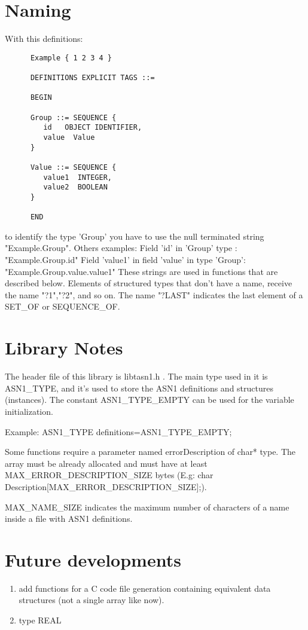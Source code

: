 \documentclass{book}
\begin{document}
\section{Naming}
With this definitions:

\begin{verbatim}
      Example { 1 2 3 4 }

      DEFINITIONS EXPLICIT TAGS ::=

      BEGIN 

      Group ::= SEQUENCE {
         id   OBJECT IDENTIFIER,
         value  Value
      }

      Value ::= SEQUENCE {
         value1  INTEGER,
         value2  BOOLEAN 
      }

      END
\end{verbatim}

to identify the type 'Group' you have to use the null terminated string "Example.Group".
Others examples:
Field 'id' in 'Group' type :  "Example.Group.id"
Field 'value1' in field 'value' in type 'Group':   "Example.Group.value.value1" 
These strings are used in functions that are described below.
Elements of structured types that don't have a name, receive the name "?1","?2", and so on. 
The name "?LAST" indicates the last element of a SET\_OF or SEQUENCE\_OF.

\section{Library Notes}
The header file of this library is libtasn1.h .
The main type used in it is ASN1\_TYPE, and it's used to
store the ASN1 definitions and structures (instances).
The constant ASN1\_TYPE\_EMPTY can be used for the variable initialization.
\par
Example:  ASN1\_TYPE  definitions=ASN1\_TYPE\_EMPTY;
\par 
Some functions require a parameter named errorDescription of char* type.
The array must be already allocated and must have at least
MAX\_ERROR\_DESCRIPTION\_SIZE bytes
(E.g: char Description[MAX\_ERROR\_DESCRIPTION\_SIZE];). 
\par
MAX\_NAME\_SIZE indicates the maximum number of characters of a name inside
a file with ASN1 definitions. 

\section{Future developments}
\begin{enumerate}
\item add functions for a C code file generation containing equivalent 
data structures (not a single array like now).
\item type REAL 
\end{enumerate}
\end{document}
